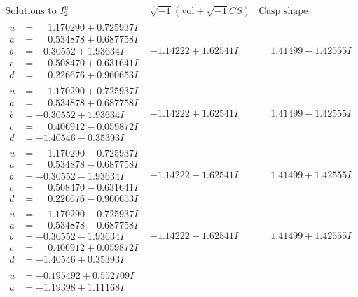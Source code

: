 \documentclass[1p]{elsarticle_modified}
\theoremstyle{definition}
\newcommand{\I}{\sqrt{-1}}
\begin{document}
$$\begin{array}{c|c|c}  
\text{Solutions to }I^u_{2}& \I (\text{vol} + \sqrt{-1}CS) & \text{Cusp shape}\\
 \hline 
\begin{aligned}
u &= \phantom{-}1.170290 + 0.725937 I \\
a &= \phantom{-}0.534878 + 0.687758 I \\
b &= -0.30552 + 1.93634 I \\
c &= \phantom{-}0.508470 + 0.631641 I \\
d &= \phantom{-}0.226676 + 0.960653 I\end{aligned}
 & -1.14222 + 1.62541 I & \phantom{-}1.41499 - 1.42555 I \\ \hline\begin{aligned}
u &= \phantom{-}1.170290 + 0.725937 I \\
a &= \phantom{-}0.534878 + 0.687758 I \\
b &= -0.30552 + 1.93634 I \\
c &= \phantom{-}0.406912 - 0.059872 I \\
d &= -1.40546 - 0.35393 I\end{aligned}
 & -1.14222 + 1.62541 I & \phantom{-}1.41499 - 1.42555 I \\ \hline\begin{aligned}
u &= \phantom{-}1.170290 - 0.725937 I \\
a &= \phantom{-}0.534878 - 0.687758 I \\
b &= -0.30552 - 1.93634 I \\
c &= \phantom{-}0.508470 - 0.631641 I \\
d &= \phantom{-}0.226676 - 0.960653 I\end{aligned}
 & -1.14222 - 1.62541 I & \phantom{-}1.41499 + 1.42555 I \\ \hline\begin{aligned}
u &= \phantom{-}1.170290 - 0.725937 I \\
a &= \phantom{-}0.534878 - 0.687758 I \\
b &= -0.30552 - 1.93634 I \\
c &= \phantom{-}0.406912 + 0.059872 I \\
d &= -1.40546 + 0.35393 I\end{aligned}
 & -1.14222 - 1.62541 I & \phantom{-}1.41499 + 1.42555 I \\ \hline\begin{aligned}
u &= -0.195492 + 0.552709 I \\
a &= -1.19398 + 1.11168 I \\

\end{aligned}
\end{array}$$
\end{document}
